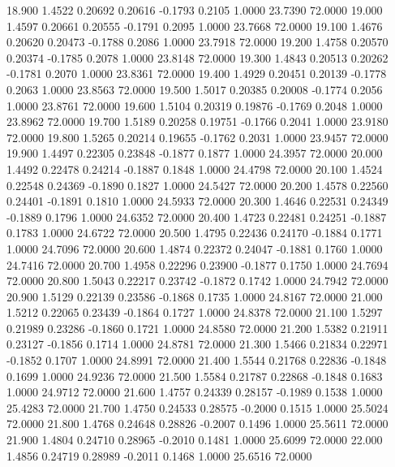   18.900   1.4522   0.20692   0.20616  -0.1793   0.2105   1.0000  23.7390  72.0000
  19.000   1.4597   0.20661   0.20555  -0.1791   0.2095   1.0000  23.7668  72.0000
  19.100   1.4676   0.20620   0.20473  -0.1788   0.2086   1.0000  23.7918  72.0000
  19.200   1.4758   0.20570   0.20374  -0.1785   0.2078   1.0000  23.8148  72.0000
  19.300   1.4843   0.20513   0.20262  -0.1781   0.2070   1.0000  23.8361  72.0000
  19.400   1.4929   0.20451   0.20139  -0.1778   0.2063   1.0000  23.8563  72.0000
  19.500   1.5017   0.20385   0.20008  -0.1774   0.2056   1.0000  23.8761  72.0000
  19.600   1.5104   0.20319   0.19876  -0.1769   0.2048   1.0000  23.8962  72.0000
  19.700   1.5189   0.20258   0.19751  -0.1766   0.2041   1.0000  23.9180  72.0000
  19.800   1.5265   0.20214   0.19655  -0.1762   0.2031   1.0000  23.9457  72.0000
  19.900   1.4497   0.22305   0.23848  -0.1877   0.1877   1.0000  24.3957  72.0000
  20.000   1.4492   0.22478   0.24214  -0.1887   0.1848   1.0000  24.4798  72.0000
  20.100   1.4524   0.22548   0.24369  -0.1890   0.1827   1.0000  24.5427  72.0000
  20.200   1.4578   0.22560   0.24401  -0.1891   0.1810   1.0000  24.5933  72.0000
  20.300   1.4646   0.22531   0.24349  -0.1889   0.1796   1.0000  24.6352  72.0000
  20.400   1.4723   0.22481   0.24251  -0.1887   0.1783   1.0000  24.6722  72.0000
  20.500   1.4795   0.22436   0.24170  -0.1884   0.1771   1.0000  24.7096  72.0000
  20.600   1.4874   0.22372   0.24047  -0.1881   0.1760   1.0000  24.7416  72.0000
  20.700   1.4958   0.22296   0.23900  -0.1877   0.1750   1.0000  24.7694  72.0000
  20.800   1.5043   0.22217   0.23742  -0.1872   0.1742   1.0000  24.7942  72.0000
  20.900   1.5129   0.22139   0.23586  -0.1868   0.1735   1.0000  24.8167  72.0000
  21.000   1.5212   0.22065   0.23439  -0.1864   0.1727   1.0000  24.8378  72.0000
  21.100   1.5297   0.21989   0.23286  -0.1860   0.1721   1.0000  24.8580  72.0000
  21.200   1.5382   0.21911   0.23127  -0.1856   0.1714   1.0000  24.8781  72.0000
  21.300   1.5466   0.21834   0.22971  -0.1852   0.1707   1.0000  24.8991  72.0000
  21.400   1.5544   0.21768   0.22836  -0.1848   0.1699   1.0000  24.9236  72.0000
  21.500   1.5584   0.21787   0.22868  -0.1848   0.1683   1.0000  24.9712  72.0000
  21.600   1.4757   0.24339   0.28157  -0.1989   0.1538   1.0000  25.4283  72.0000
  21.700   1.4750   0.24533   0.28575  -0.2000   0.1515   1.0000  25.5024  72.0000
  21.800   1.4768   0.24648   0.28826  -0.2007   0.1496   1.0000  25.5611  72.0000
  21.900   1.4804   0.24710   0.28965  -0.2010   0.1481   1.0000  25.6099  72.0000
  22.000   1.4856   0.24719   0.28989  -0.2011   0.1468   1.0000  25.6516  72.0000
